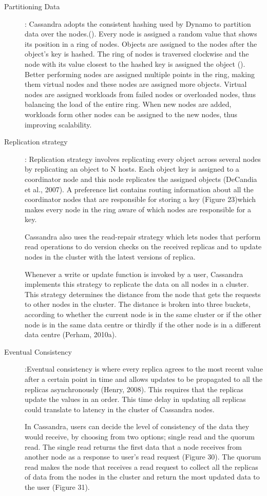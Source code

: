 \begin{description}
  \item  [Partitioning Data]: Cassandra adopts the consistent hashing used by
  Dynamo to partition data over the nodes.(). Every node is  assigned a random value that shows its position in a
  ring of nodes. Objects are assigned to the nodes after the object's key is
  hashed. The ring of nodes is traversed clockwise and the node with its value
  closest to the hashed key is assigned the object (). Better
  performing nodes are assigned multiple points in the ring, making them virtual
  nodes and these nodes are assigned more objects. Virtual nodes are
  assigned workloads from failed nodes or overloaded nodes, thus balancing the
  load of the entire ring. When new nodes are added, workloads form other nodes
  can be assigned to the new nodes, thus improving scalability.

  \item  [Replication strategy]: Replication strategy involves replicating every
  object across several nodes by replicating an object to N hosts. Each object
  key is assigned to a coordinator node and this node replicates the assigned
  objects (DeCandia et al., 2007). A preference list
  contains routing information about all the coordinator nodes that are
  responsible for storing a key (Figure 23)which makes every node in the ring
  aware of which nodes are responsible for a key.

  Cassandra also uses the read-repair strategy which lets nodes
  that perform read operations to do version checks on the received replicas and to
  update nodes in the cluster with the latest versions of replica.

  Whenever a write or update function is invoked by a user, Cassandra implements
  this strategy to replicate the data on all nodes in a cluster. This
  strategy determines the distance from the node that gets the requests to other
  nodes in the cluster. The distance is broken into three buckets, according to
  whether the current node is in the same cluster or if the other node is in the
  same data centre or thirdly if the other node is in a different data centre
  (Perham, 2010a).

  \item [Eventual Consistency]:Eventual consistency is where every replica
  agrees to the most recent value after a certain point in time and allows
  updates to be propagated to all the replicas asynchronously (Henry, 2008).
  This requires that the replicas update the values in an order. This time delay
  in updating all replicas could translate to latency in the cluster of
  Cassandra nodes.

  In Cassandra, users can decide the level of consistency of the data they would
  receive, by choosing from two options; single read and the
  quorum read. The single read returns the first data that a node receives from
  another node as a response to user's read request (Figure 30). The quorum read
  makes the node that receives a read request to collect all the replicas of
  data from the nodes in the cluster and return the most updated data to the
  user (Figure 31).

\end{description}

